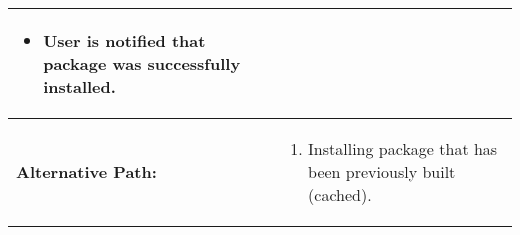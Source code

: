 \begin{tabularx}{\linewidth}{|l|X|}
\begin{minipage}{\linewidth}
\begin{itemize}
    \item User is notified that package was successfully installed.
  \end{itemize}
  \vspace{0.05em}
\end{minipage}
\\
\hline 
\textbf{Alternative Path:} &
\begin{minipage}{\linewidth}
  \vspace{0.05em} 
  \begin{enumerate}
    \item Installing package that has been previously built (cached).
  \end{enumerate}
  \vspace{0.05em} 
\end{minipage}
\\
\hline
\end{tabularx}

\newpage


